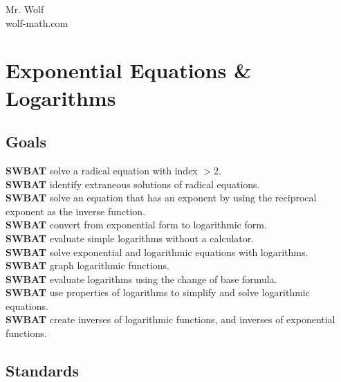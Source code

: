 \documentclass[12pt]{article}
\begin{document}
\newcommand{\random}{\rand\arabic{rand}}
\setcounter{secnumdepth}{-1}

\tableofcontents

\pagebreak



Mr. Wolf  \\ wolf-math.com

\section{Exponential Equations \& Logarithms}



\subsection{Goals}

\textbf{SWBAT} solve a radical equation with index $>2$.\\

\textbf{SWBAT} identify extraneous solutions of radical equations.\\

\textbf{SWBAT} solve an equation that has an exponent by using the reciprocal exponent as the inverse function.\\

\textbf{SWBAT} convert from exponential form to logarithmic form.\\

\textbf{SWBAT} evaluate simple logarithms without a calculator.\\

\textbf{SWBAT} solve exponential and logarithmic equations with logarithms.\\

\textbf{SWBAT} graph logarithmic functions.\\

\textbf{SWBAT} evaluate logarithms using the change of base formula.\\

\textbf{SWBAT} use properties of logarithms to simplify and solve logarithmic equations.\\

\textbf{SWBAT} create inverses of logarithmic functions, and inverses of exponential functions.\\



\subsection{Standards}
\end{document}
